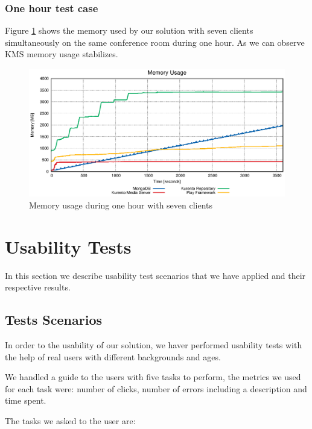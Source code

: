 \subsubsection{One hour test case}


   Figure \ref{fig:test_hour_mem} shows the memory used by our solution with seven clients simultaneously on the same conference room during one hour. As we can observe \ac{KMS} memory usage stabilizes.


\begin{figure}
  \centering
  \includegraphics[width=\textwidth]{stats/test_hour_mem.eps}
  \caption{Memory usage during one hour with seven clients}
  \label{fig:test_hour_mem}
\end{figure}





\section {Usability Tests}
     In this section we describe usability test scenarios that we have applied and their respective results.


    \subsection{Tests Scenarios}

      In order to the usability of our solution, we haver performed usability tests with the help of real users with different backgrounds and ages.

      We handled a guide to the users with five tasks to perform, the metrics we used for each task were: number of clicks, number of errors including a description and time spent. 

      The tasks we asked to the user are:

